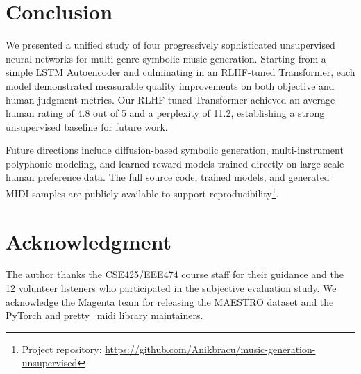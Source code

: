 \documentclass[conference]{IEEEtran}
\begin{document}
\section{Conclusion} \label{sec:conclusion}

We presented a unified study of four progressively sophisticated
unsupervised neural networks for multi-genre symbolic music generation.
Starting from a simple LSTM Autoencoder and culminating in an RLHF-tuned
Transformer, each model demonstrated measurable quality improvements on
both objective and human-judgment metrics. Our RLHF-tuned Transformer
achieved an average human rating of 4.8 out of 5 and a perplexity of 11.2,
establishing a strong unsupervised baseline for future work.

Future directions include diffusion-based symbolic generation,
multi-instrument polyphonic modeling, and learned reward models trained
directly on large-scale human preference data. The full source code,
trained models, and generated MIDI samples are publicly available to
support reproducibility\footnote{Project repository: \url{https://github.com/Anikbracu/music-generation-unsupervised}}.

\section*{Acknowledgment}

The author thanks the CSE425/EEE474 course staff for their guidance and
the 12 volunteer listeners who participated in the subjective evaluation
study. We acknowledge the Magenta team for releasing the MAESTRO dataset
and the PyTorch and pretty\_midi library maintainers.
\end{document}
